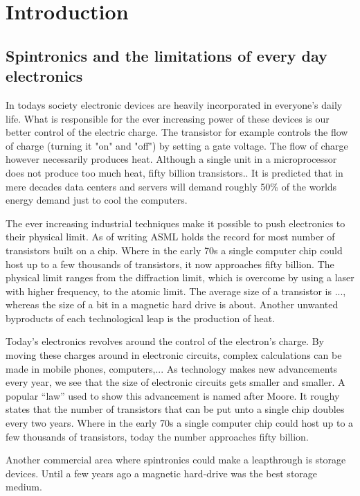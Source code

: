 \chapter{Introduction}\label{ch:introduction}
\section{Spintronics and the limitations of every day electronics}
In todays society electronic devices are heavily incorporated in everyone's daily life. What is responsible for the ever increasing power of these devices is our better control of the electric charge. The transistor for example controls the flow of charge (turning it "on" and "off") by setting a gate voltage. The flow of charge however necessarily produces heat. Although a single unit in a microprocessor does not produce too much heat, fifty billion transistors.. It is predicted that in mere decades data centers and servers will demand roughly 50\% of the worlds energy demand just to cool the computers. 

The ever increasing industrial techniques make it possible to push electronics to their physical limit. As of writing ASML holds the record for most number of transistors built on a chip. Where in the early 70s a single computer chip could host up to a few thousands of transistors, it now approaches fifty billion. The physical limit ranges from the diffraction limit, which is overcome by using a laser with higher frequency, to the atomic limit. The average size of a transistor is ..., whereas the size of a bit in a magnetic hard drive is about. Another unwanted byproducts of each technological leap is the production of heat. 


Today's electronics revolves around the control of the electron's charge. By moving these charges around in electronic circuits, complex calculations can be made in mobile phones, computers,... As technology makes new advancements every year, we see that the size of electronic circuits gets smaller and smaller. A popular ``law'' used to show this advancement is named after Moore. It roughy states that the number of transistors that can be put unto a single chip doubles every two years. Where in the early 70s a single computer chip could host up to a few thousands of transistors, today the number approaches fifty billion.  

Another commercial area where spintronics could make a leapthrough is storage devices. Until a few years ago a magnetic hard-drive was the best storage medium. 

